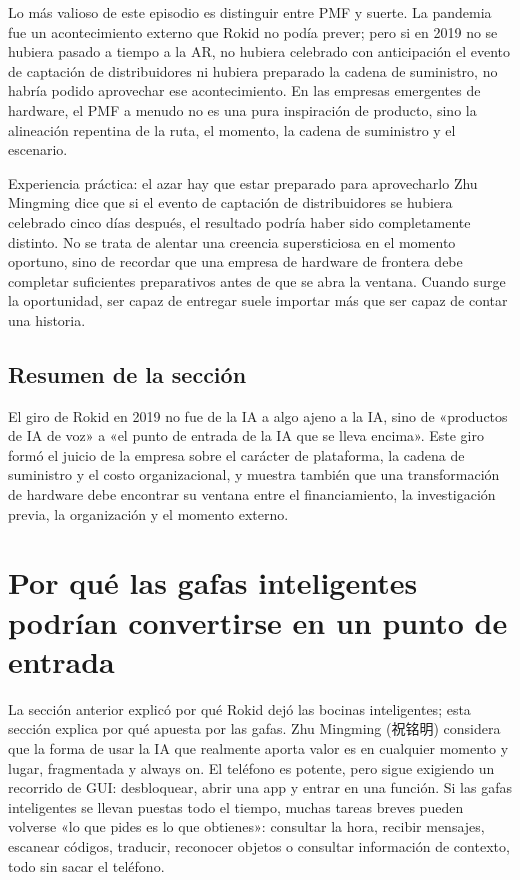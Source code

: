 \documentclass[a4paper]{article}
\begin{document}
Lo más valioso de este episodio es distinguir entre PMF y suerte. La pandemia fue un acontecimiento externo que Rokid no podía prever; pero si en 2019 no se hubiera pasado a tiempo a la AR, no hubiera celebrado con anticipación el evento de captación de distribuidores ni hubiera preparado la cadena de suministro, no habría podido aprovechar ese acontecimiento. En las empresas emergentes de hardware, el PMF a menudo no es una pura inspiración de producto, sino la alineación repentina de la ruta, el momento, la cadena de suministro y el escenario.

\begin{knowledgebox}{Experiencia práctica: el azar hay que estar preparado para aprovecharlo}
Zhu Mingming dice que si el evento de captación de distribuidores se hubiera celebrado cinco días después, el resultado podría haber sido completamente distinto. No se trata de alentar una creencia supersticiosa en el momento oportuno, sino de recordar que una empresa de hardware de frontera debe completar suficientes preparativos antes de que se abra la ventana. Cuando surge la oportunidad, ser capaz de entregar suele importar más que ser capaz de contar una historia.
\end{knowledgebox}

\subsection{Resumen de la sección}

El giro de Rokid en 2019 no fue de la IA a algo ajeno a la IA, sino de «productos de IA de voz» a «el punto de entrada de la IA que se lleva encima». Este giro formó el juicio de la empresa sobre el carácter de plataforma, la cadena de suministro y el costo organizacional, y muestra también que una transformación de hardware debe encontrar su ventana entre el financiamiento, la investigación previa, la organización y el momento externo.
\section{Por qué las gafas inteligentes podrían convertirse en un punto de entrada}

La sección anterior explicó por qué Rokid dejó las bocinas inteligentes; esta sección explica por qué apuesta por las gafas. Zhu Mingming (祝铭明) considera que la forma de usar la IA que realmente aporta valor es en cualquier momento y lugar, fragmentada y always on. El teléfono es potente, pero sigue exigiendo un recorrido de GUI: desbloquear, abrir una app y entrar en una función. Si las gafas inteligentes se llevan puestas todo el tiempo, muchas tareas breves pueden volverse «lo que pides es lo que obtienes»: consultar la hora, recibir mensajes, escanear códigos, traducir, reconocer objetos o consultar información de contexto, todo sin sacar el teléfono.
\end{document}
